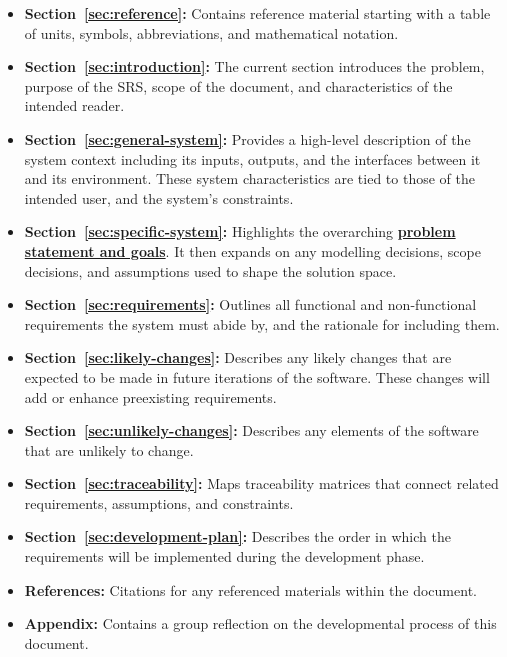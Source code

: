 \documentclass[12pt]{article}
\begin{document}
\begin{itemize}
    \item \textbf{Section~\ref{sec:reference}:} Contains reference material starting with a table of units, symbols, abbreviations, and mathematical notation.

    \item \textbf{Section~\ref{sec:introduction}:} The current section introduces the problem, purpose of the SRS, scope of the document, and characteristics of the intended reader.

    \item \textbf{Section~\ref{sec:general-system}:} Provides a high-level description of the system context including its inputs, outputs, and the interfaces between it and its environment. These system characteristics are tied to those of the intended user, and the system’s constraints.

    \item \textbf{Section~\ref{sec:specific-system}:} Highlights the overarching \textbf{\href{https://github.com/lilyporter/Ghoti/blob/main/pdfs/ProblemStatementAndGoals/ProblemStatement.pdf}{problem statement and goals}}. It then expands on any modelling decisions, scope decisions, and assumptions used to shape the solution space.

    \item \textbf{Section~\ref{sec:requirements}:} Outlines all functional and non-functional requirements the system must abide by, and the rationale for including them.

    \item \textbf{Section~\ref{sec:likely-changes}:} Describes any likely changes that are expected to be made in future iterations of the software. These changes will add or enhance preexisting requirements.

    \item \textbf{Section~\ref{sec:unlikely-changes}:} Describes any elements of the software that are unlikely to change.

    \item \textbf{Section~\ref{sec:traceability}:} Maps traceability matrices that connect related requirements, assumptions, and constraints.

    \item \textbf{Section~\ref{sec:development-plan}:} Describes the order in which the requirements will be implemented during the development phase.

    \item \textbf{References:} Citations for any referenced materials within the document.

    \item \textbf{Appendix:} Contains a group reflection on the developmental process of this document.
\end{itemize}  
\end{document}

